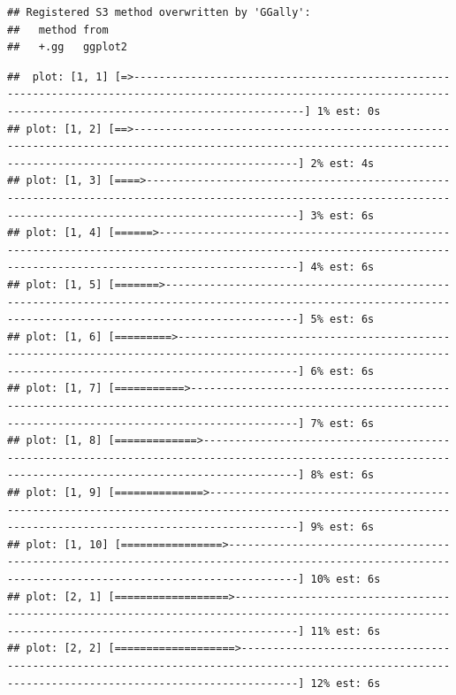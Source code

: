 \documentclass[
]{article}
\begin{document}
\begin{verbatim}
## Registered S3 method overwritten by 'GGally':
##   method from   
##   +.gg   ggplot2
\end{verbatim}

\begin{verbatim}
##  plot: [1, 1] [=>-----------------------------------------------------------------------------------------------------------------------------------------------------------------------] 1% est: 0s 
## plot: [1, 2] [==>----------------------------------------------------------------------------------------------------------------------------------------------------------------------] 2% est: 4s 
## plot: [1, 3] [====>--------------------------------------------------------------------------------------------------------------------------------------------------------------------] 3% est: 6s 
## plot: [1, 4] [======>------------------------------------------------------------------------------------------------------------------------------------------------------------------] 4% est: 6s 
## plot: [1, 5] [=======>-----------------------------------------------------------------------------------------------------------------------------------------------------------------] 5% est: 6s 
## plot: [1, 6] [=========>---------------------------------------------------------------------------------------------------------------------------------------------------------------] 6% est: 6s 
## plot: [1, 7] [===========>-------------------------------------------------------------------------------------------------------------------------------------------------------------] 7% est: 6s 
## plot: [1, 8] [=============>-----------------------------------------------------------------------------------------------------------------------------------------------------------] 8% est: 6s 
## plot: [1, 9] [==============>----------------------------------------------------------------------------------------------------------------------------------------------------------] 9% est: 6s 
## plot: [1, 10] [================>-------------------------------------------------------------------------------------------------------------------------------------------------------] 10% est: 6s 
## plot: [2, 1] [==================>------------------------------------------------------------------------------------------------------------------------------------------------------] 11% est: 6s 
## plot: [2, 2] [===================>-----------------------------------------------------------------------------------------------------------------------------------------------------] 12% est: 6s 

\end{verbatim}
\end{document}
